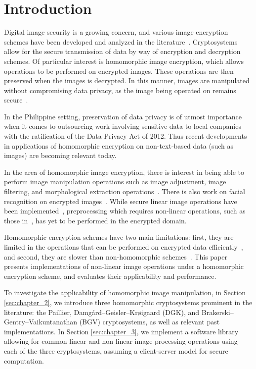 \section{Introduction}
Digital image security is a growing concern, and various image encryption schemes have been developed and analyzed in the literature~\cite{murugan_survey_2018, jain_image_2016, khoirom_cryptanalysis_2018}. Cryptosystems allow for the secure transmission of data by way of encryption and decryption schemes. 
Of particular interest is homomorphic image encryption, which allows operations to be performed on encrypted images. These operations are then preserved when the images is decrypted. In this manner, images are manipulated without compromising data privacy, as the image being operated on remains secure~\cite{fontaine_survey_2007, sen_homomorphic_2013}. 

In the Philippine setting, preservation of data privacy is of utmost importance when it comes to outsourcing work involving sensitive data to local companies with the ratification of the Data Privacy Act of 2012. Thus recent developments in applications of homomorphic encryption on non-text-based data (such as images) are becoming relevant today.

In the area of homomorphic image encryption, there is interest in being able to perform image manipulation operations such as image adjustment, image filtering, and morphological extraction operations~\cite{ziad_cryptoimg:_2016, gonzalez_digital_2008}. There is also work on facial recognition on encrypted images~\cite{turk_eigenfaces_1991, hutchison_privacy-preserving_2009}. While secure linear image operations have been implemented~\cite{ziad_cryptoimg:_2016}, preprocessing which requires non-linear operations, such as those in~\cite{oravec_illumination_2010}, has yet to be performed in the encrypted domain.

Homomorphic encryption schemes have two main limitations: first, they are limited in the operations that can be performed on encrypted data efficiently~\cite{li_elliptic_2012}, and second, they are slower than non-homomorphic schemes~\cite{sen_homomorphic_2013}. This paper presents implementations of non-linear image operations under a homomorphic encryption scheme, and evaluates their applicability and performance.

To investigate the applicability of homomorphic image manipulation, in Section \ref{sec:chapter_2}, we introduce three homomorphic cryptosystems prominent in the literature: the Paillier, Damg{\aa}rd--Geisler--Kr{\o}igaard (DGK), and Brakerski--Gentry--Vaikuntanathan (BGV) cryptosystems, as well as relevant past implementations. In Section \ref{sec:chapter_3}, we implement a software library allowing for common linear and non-linear image processing operations using each of the three cryptosystems, assuming a client-server model for secure computation.

